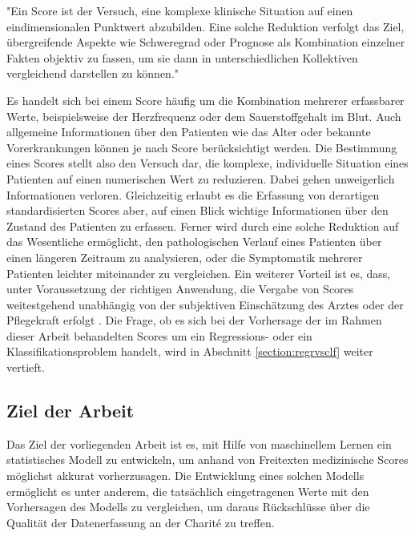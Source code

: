 \begin{itquote}
    "Ein Score ist der Versuch, eine komplexe klinische Situation auf einen eindimensionalen Punktwert abzubilden. Eine solche Reduktion verfolgt das Ziel, übergreifende Aspekte wie Schweregrad oder Prognose als Kombination einzelner Fakten objektiv zu fassen, um sie dann in unterschiedlichen Kollektiven vergleichend darstellen zu können."
\end{itquote}

Es handelt sich bei einem Score häufig um die Kombination mehrerer erfassbarer Werte, beispielsweise der Herzfrequenz oder dem Sauerstoffgehalt im Blut. Auch allgemeine Informationen über den Patienten wie das Alter oder bekannte Vorerkrankungen können je nach Score berücksichtigt werden. Die Bestimmung eines Scores stellt also den Versuch dar, die komplexe, individuelle Situation eines Patienten auf einen numerischen Wert zu reduzieren. Dabei gehen unweigerlich Informationen verloren. Gleichzeitig erlaubt es die Erfassung von derartigen standardisierten Scores aber, auf einen Blick wichtige Informationen über den Zustand des Patienten zu erfassen. Ferner wird durch eine solche Reduktion auf das Wesentliche ermöglicht, den pathologischen Verlauf eines Patienten über einen längeren Zeitraum zu analysieren, oder die Symptomatik mehrerer Patienten leichter miteinander zu vergleichen. Ein weiterer Vorteil ist es, dass, unter Voraussetzung der richtigen Anwendung, die Vergabe von Scores weitestgehend unabhängig von der subjektiven Einschätzung des Arztes oder der Pflegekraft erfolgt \citep{marxIntensivmedizin2015c}.
Die Frage, ob es sich bei der Vorhersage der im Rahmen dieser Arbeit behandelten Scores um ein Regressions- oder ein Klassifikationsproblem handelt, wird in Abschnitt \ref{section:regrvsclf} weiter vertieft. 

\subsection{Ziel der Arbeit}
Das Ziel der vorliegenden Arbeit ist es, mit Hilfe von maschinellem Lernen ein statistisches Modell zu entwickeln, um anhand von Freitexten medizinische Scores möglichst akkurat vorherzusagen. Die Entwicklung eines solchen Modells ermöglicht es unter anderem, die tatsächlich eingetragenen Werte mit den Vorhersagen des Modells zu vergleichen, um daraus Rückschlüsse über die Qualität der Datenerfassung an der Charité zu treffen.

